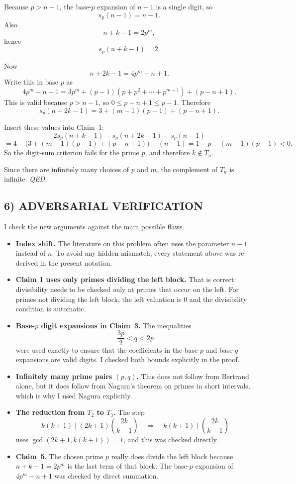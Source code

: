 Because $p>n-1$, the base-$p$ expansion of $n-1$ is a single digit, so
\[
s_p(n-1)=n-1.
\]
Also
\[
n+k-1=2p^m,
\]
hence
\[
s_p(n+k-1)=2.
\]

Now
\[
n+2k-1=4p^m-n+1.
\]
Write this in base $p$ as
\[
4p^m-n+1
=3p^m+(p-1)(p+p^2+\cdots+p^{m-1})+(p-n+1).
\]
This is valid because $p>n-1$, so $0\le p-n+1\le p-1$.
Therefore
\[
s_p(n+2k-1)=3+(m-1)(p-1)+(p-n+1).
\]

Insert these values into Claim~1:
\[
2s_p(n+k-1)-s_p(n+2k-1)-s_p(n-1)
\]
\[
=4-\bigl(3+(m-1)(p-1)+(p-n+1)\bigr)-(n-1)
=1-p-(m-1)(p-1)<0.
\]
So the digit-sum criterion fails for the prime $p$, and therefore $k\notin T_n$.

Since there are infinitely many choices of $p$ and $m$, the complement of $T_n$ is infinite.
\hfill\textit{QED.}

\subsection*{6) ADVERSARIAL VERIFICATION}

I check the new arguments against the main possible flaws.

\begin{itemize}
\item \textbf{Index shift.}
The literature on this problem often uses the parameter $n-1$ instead of $n$.
To avoid any hidden mismatch, every statement above was re-derived in the present notation.

\item \textbf{Claim 1 uses only primes dividing the left block.}
That is correct: divisibility needs to be checked only at primes that occur on the left.  For primes not dividing the left block, the left valuation is $0$ and the divisibility condition is automatic.

\item \textbf{Base-$p$ digit expansions in Claim~3.}
The inequalities
\[
\frac{3p}{2}<q<2p
\]
were used exactly to ensure that the coefficients in the base-$p$ and base-$q$ expansions are valid digits.  I checked both bounds explicitly in the proof.

\item \textbf{Infinitely many prime pairs $(p,q)$.}
This does not follow from Bertrand alone, but it does follow from Nagura's theorem on primes in short intervals, which is why I used Nagura explicitly.

\item \textbf{The reduction from $T_2$ to $T_3$.}
The step
\[
k(k+1)\mid (2k+1){2k\choose k-1}
\quad\Rightarrow\quad
k(k+1)\mid {2k\choose k-1}
\]
uses $\gcd(2k+1,k(k+1))=1$, and this was checked directly.

\item \textbf{Claim~5.}
The chosen prime $p$ really does divide the left block because $n+k-1=2p^m$ is the last term of that block.  The base-$p$ expansion of $4p^m-n+1$ was checked by direct summation.
\end{itemize}

